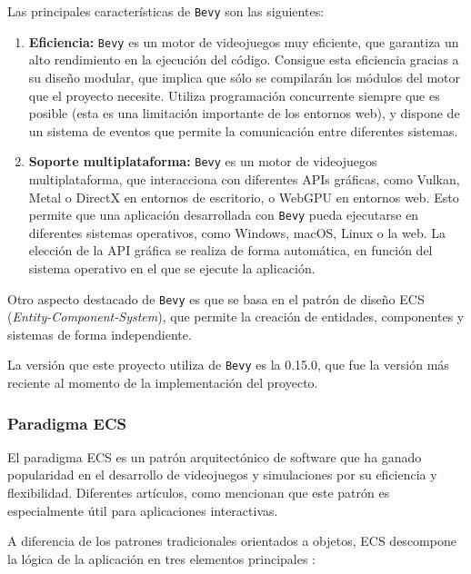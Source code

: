 Las principales características de \texttt{Bevy} son las siguientes:
\begin{enumerate}
    \item \textbf{Eficiencia:} \texttt{Bevy} es un motor de videojuegos muy eficiente, que garantiza un alto rendimiento en la ejecución del código. Consigue esta eficiencia gracias a su diseño modular, que implica que sólo se compilarán los módulos del motor que el proyecto necesite. Utiliza programación concurrente siempre que es posible (esta es una limitación importante de los entornos web), y dispone de un sistema de eventos que permite la comunicación entre diferentes sistemas.
    \item \textbf{Soporte multiplataforma:} \texttt{Bevy} es un motor de videojuegos multiplataforma, que interacciona con diferentes APIs gráficas, como Vulkan, Metal o DirectX en entornos de escritorio, o WebGPU en entornos web. Esto permite que una aplicación desarrollada con \texttt{Bevy} pueda ejecutarse en diferentes sistemas operativos, como Windows, macOS, Linux o la web. La elección de la API gráfica se realiza de forma automática, en función del sistema operativo en el que se ejecute la aplicación.
\end{enumerate}

Otro aspecto destacado de \texttt{Bevy} es que se basa en el patrón de diseño ECS (\textit{Entity-Component-System}), que permite la creación de entidades, componentes y sistemas de forma independiente. 

La versión que este proyecto utiliza de \texttt{Bevy} es la 0.15.0, que fue la versión más reciente al momento de la implementación del proyecto.

\subsubsection{Paradigma \acs{ECS}} \label{subsec:ecs}

El paradigma \ac{ECS} es un patrón arquitectónico de software que ha ganado popularidad en el desarrollo de videojuegos y simulaciones por su eficiencia y flexibilidad. Diferentes artículos, como \autocite{zaksWhenNotUse2018} mencionan que este patrón es especialmente útil para aplicaciones interactivas.

A diferencia de los patrones tradicionales orientados a objetos, \ac{ECS} descompone la lógica de la aplicación en tres elementos principales \autocite{SistemaComponentesEntidad2024}:

